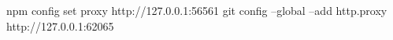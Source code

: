 npm config set proxy http://127.0.0.1:56561
git config --global --add http.proxy http://127.0.0.1:62065